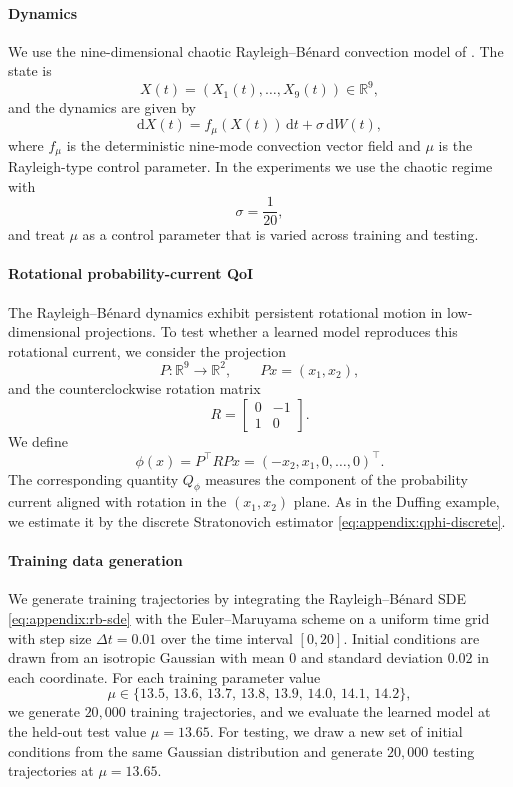 \documentclass[oneside,11pt]{article}
\theoremstyle{remark}
\begin{document}
\paragraph{Dynamics}
We use the nine-dimensional chaotic Rayleigh--Bénard convection model of
\cite{reiterer-lainscek-schuerrer-etal:1998}.  The state is
\[
    X(t) = (X_1(t),\ldots,X_9(t)) \in \mathbb{R}^9,
\]
and the dynamics are given by
\begin{equation}
    \mathrm dX(t)
    =
    f_\mu(X(t))\,\mathrm dt
    +
    \sigma\,\mathrm dW(t),
    \label{eq:appendix:rb-sde}
\end{equation}
where $f_\mu$ is the deterministic nine-mode convection vector field and
$\mu$ is the Rayleigh-type control parameter.  In the experiments we use the
chaotic regime with
\[
    \sigma = \frac{1}{20},
\]
and treat $\mu$ as a control parameter that is varied across training and testing.

\paragraph{Rotational probability-current QoI}
The Rayleigh--Bénard dynamics exhibit persistent rotational motion in
low-dimensional projections.  To test whether a learned model reproduces this
rotational current, we consider the projection
\[
    P : \mathbb{R}^9 \to \mathbb{R}^2,
    \qquad
    Px = (x_1,x_2),
\]
and the counterclockwise rotation matrix
\[
    R =
    \begin{bmatrix}
        0 & -1 \\
        1 & 0
    \end{bmatrix}.
\]
We define
\begin{equation}
    \phi(x)
    =
    P^\top R Px
    =
    (-x_2,x_1,0,\ldots,0)^\top.
    \label{eq:appendix:rb-phi}
\end{equation}
The corresponding quantity $Q_\phi$ measures the component of the
probability current aligned with rotation in the $(x_1,x_2)$ plane.  As in
the Duffing example, we estimate it by the discrete Stratonovich estimator
\eqref{eq:appendix:qphi-discrete}.

\paragraph{Training data generation} 
We generate training trajectories by integrating the Rayleigh--Bénard SDE
\eqref{eq:appendix:rb-sde} with the Euler--Maruyama scheme on a uniform time
grid with step size $\Delta t = 0.01$ over the time interval $[0, 20]$.
Initial conditions are drawn from an isotropic Gaussian with mean $0$ and
standard deviation $0.02$ in each coordinate. For each training parameter
value
\[
    \mu \in \{13.5,\, 13.6,\, 13.7,\, 13.8,\, 13.9,\, 14.0,\, 14.1,\, 14.2\},
\]
we generate $20{,}000$ training trajectories, and we evaluate the learned
model at the held-out test value $\mu = 13.65$. For testing, we draw a new
set of initial conditions from the same Gaussian distribution and generate
$20{,}000$ testing trajectories at $\mu = 13.65$.
\end{document}
